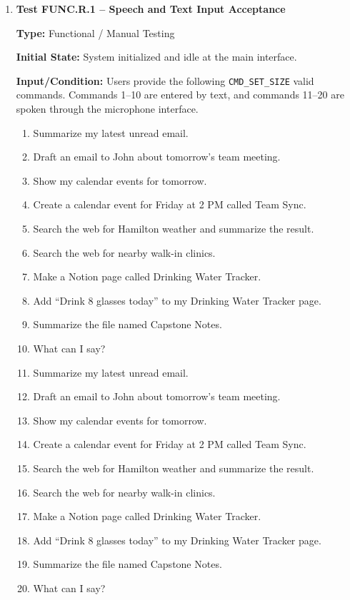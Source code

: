\documentclass[12pt, titlepage]{article}
\begin{document}
\begin{enumerate}

\item \textbf{Test FUNC.R.1 -- Speech and Text Input Acceptance}

\textbf{Type:} Functional / Manual Testing

\textbf{Initial State:} System initialized and idle at the main
interface.

\textbf{Input/Condition:} Users provide the following
\texttt{CMD\_SET\_SIZE} valid commands. Commands 1--10 are entered by
text, and commands 11--20 are spoken through the microphone interface.

{\renewcommand{\labelenumii}{\arabic{enumii}.}
\begin{enumerate}
  \item Summarize my latest unread email.
  \item Draft an email to John about tomorrow's team meeting.
  \item Show my calendar events for tomorrow.
  \item Create a calendar event for Friday at 2 PM called Team Sync.
  \item Search the web for Hamilton weather and summarize the result.
  \item Search the web for nearby walk-in clinics.
  \item Make a Notion page called Drinking Water Tracker.
  \item Add ``Drink 8 glasses today'' to my Drinking Water Tracker page.
  \item Summarize the file named Capstone Notes.
  \item What can I say?
  \item Summarize my latest unread email.
  \item Draft an email to John about tomorrow's team meeting.
  \item Show my calendar events for tomorrow.
  \item Create a calendar event for Friday at 2 PM called Team Sync.
  \item Search the web for Hamilton weather and summarize the result.
  \item Search the web for nearby walk-in clinics.
  \item Make a Notion page called Drinking Water Tracker.
  \item Add ``Drink 8 glasses today'' to my Drinking Water Tracker page.
  \item Summarize the file named Capstone Notes.
  \item What can I say?
\end{enumerate}
}


\end{enumerate}
\end{document}
